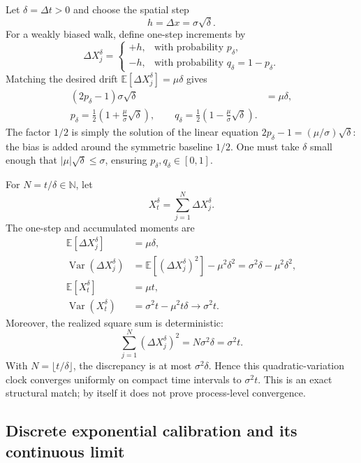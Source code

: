 \documentclass[10pt,a4paper]{article}
\numberwithin{equation}{section}
\theoremstyle{blueplain}
\theoremstyle{definition}
\newcommand{\E}{\mathbb E}
\newcommand{\Var}{\operatorname{Var}}
\begin{document}
Let \(\delta=\Delta t>0\) and choose the spatial step
\begin{equation}
  h=\Delta x=\sigma\sqrt\delta.
  \label{eq:diffusion-scaling}
\end{equation}
For a weakly biased walk, define one-step increments by
\[
  \Delta X_j^\delta=
  \begin{cases}
    +h,&\text{with probability }p_\delta,\\
    -h,&\text{with probability }q_\delta=1-p_\delta.
  \end{cases}
\]
Matching the desired drift \(\E[\Delta X_j^\delta]=\mu\delta\) gives
\begin{align}
  (2p_\delta-1)\sigma\sqrt\delta&=\mu\delta,\\
  \boxed{
  p_\delta=\frac12\left(1+\frac\mu\sigma\sqrt\delta\right),
  \qquad
  q_\delta=\frac12\left(1-\frac\mu\sigma\sqrt\delta\right).
  }
  \label{eq:weak-bias}
\end{align}
The factor \(1/2\) is simply the solution of the linear equation
\(2p_\delta-1=(\mu/\sigma)\sqrt\delta\): the bias is added around the symmetric
baseline \(1/2\).  One must take \(\delta\) small enough that
\(|\mu|\sqrt\delta\le\sigma\), ensuring \(p_\delta,q_\delta\in[0,1]\).

For \(N=t/\delta\in\mathbb N\), let
\[
  X_t^\delta=\sum_{j=1}^{N}\Delta X_j^\delta.
\]
The one-step and accumulated moments are
\begin{align}
  \E[\Delta X_j^\delta]&=\mu\delta,\\
  \Var(\Delta X_j^\delta)
  &=\E[(\Delta X_j^\delta)^2]-\mu^2\delta^2
    =\sigma^2\delta-\mu^2\delta^2,\\
  \E[X_t^\delta]&=\mu t,\\
  \Var(X_t^\delta)&=\sigma^2t-\mu^2t\delta
    \longrightarrow\sigma^2t.
  \label{eq:arw-moments}
\end{align}
Moreover, the realized square sum is deterministic:
\begin{equation}
  \sum_{j=1}^{N}(\Delta X_j^\delta)^2
  =N\sigma^2\delta=\sigma^2t.
  \label{eq:scaled-qv}
\end{equation}
With \(N=\lfloor t/\delta\rfloor\), the discrepancy is at most
\(\sigma^2\delta\).  Hence this quadratic-variation clock converges uniformly
on compact time intervals to \(\sigma^2t\).  This is an exact structural match;
by itself it does not prove process-level convergence.

\subsection{Discrete exponential calibration and its continuous limit}
\end{document}
